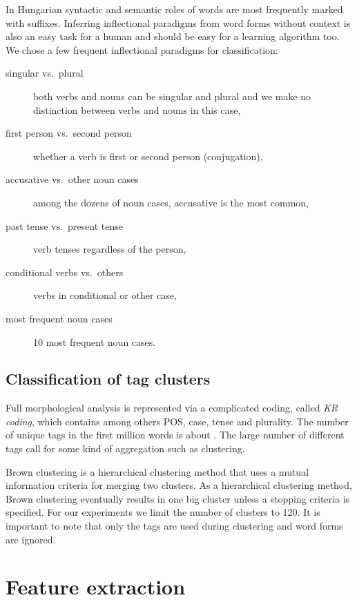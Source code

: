 \documentclass{article}
\begin{document}
In Hungarian syntactic and semantic roles of words are most frequently marked with suffixes.
Inferring inflectional paradigms from word forms without context is also an easy task for a human and should be easy for a learning algorithm too.
We chose a few frequent inflectional paradigms for classification:

\begin{description}
    \item[singular vs.~plural] both verbs and nouns can be singular and plural and we make no distinction between verbs and nouns in this case,
    \item[first person vs.~second person] whether a verb is first or second person (conjugation),
    \item[accusative vs.~other noun cases] among the dozens of noun cases, accusative is the most common,
    \item[past tense vs.~present tense] verb tenses regardless of the person,
    \item[conditional verbs vs.~others] verbs in conditional or other case,
    \item[most frequent noun cases] 10 most frequent noun cases.
\end{description}

\subsection{Classification of tag clusters}

Full morphological analysis is represented via a complicated coding, called \emph{KR coding}, which contains among others POS, case, tense and plurality.
The number of unique tags in the first million words is about .
The large number of different tags call for some kind of aggregation such as clustering.

Brown clustering is a hierarchical clustering method that uses a mutual information criteria for merging two clusters.
As a hierarchical clustering method, Brown clustering eventually results in one big cluster unless a stopping criteria is specified.
For our experiments we limit the number of clusters to 120.
It is important to note that only the tags are used during clustering and word forms are ignored.

\section{Feature extraction}
\end{document}
